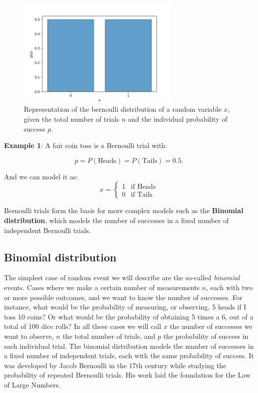 \documentclass{book}
\begin{document}
\begin{figure}[ht]
    \centering
    \includegraphics[width=0.7\textwidth]{figures/chapter2/bernoulli.png}
    \caption{Representation of the bernoulli distribution of a random variable $x$, given the total number of trials $n$ and the individual probability of success $p$.}
    \label{fig:bernoulli1}
\end{figure}

\textbf{Example 1}: A fair coin toss is a Bernoulli trial with:

\begin{equation}
p = P(\text{Heads}) = P(\text{Tails}) = 0.5.
\end{equation}

And we can model it as:
\begin{equation}
x = 
\begin{cases}
1 & \text{if Heads} \\
0 & \text{if Tails}
\end{cases}
\end{equation}

Bernoulli trials form the basis for more complex models such as the \textbf{Binomial distribution}, which models the number of successes in a fixed number of independent Bernoulli trials.

\newpage

\subsection{Binomial distribution}
The simplest case of random event we will describe are the so-called \textit{binomial} events. Cases where we make a certain number of measurements $n$, each with two or more possible outcomes, and we want to know the number of successes. For instance, what would be the probability of measuring, or observing, 5 heads if I toss 10 coins? Or what would be the probability of obtaining 5 times a 6, out of a total of 100 dice rolls? In all these cases we will call $x$ the number of successes we want to observe, $n$ the total number of trials, and $p$ the probability of success in each individual trial. The binomial distribution models the number of successes in a fixed number of independent trials, each with the same probability of success. It was developed by Jacob Bernoulli in the 17th century while studying the probability of repeated Bernoulli trials. His work laid the foundation for the Law of Large Numbers.\\
\end{document}
